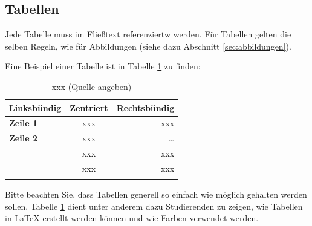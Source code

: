 \subsection{Tabellen}

Jede Tabelle muss im Fließtext referenziertw werden. Für Tabellen gelten die selben Regeln, wie für Abbildungen (siehe dazu Abschnitt \ref{sec:abbildungen}).

Eine Beispiel einer Tabelle ist in Tabelle \ref{tab:xxx} zu finden:
\begin{table}
	\centering
	\begin{tabular}{| >{\bfseries}l | c | r | }
		\hline
			\rowcolor{orange} \bfseries Linksbündig & \bfseries Zentriert & \bfseries Rechtsbündig \\
		\hline
		\hline
			Zeile 1 & xxx & xxx \\\hline
			Zeile 2 & xxx & \dots \\\hline
			\multirow{2}{*}{Zeile3}
			& xxx & xxx \\\cline{2-3}
			& xxx & xxx \\\hline
		\hline
			\multicolumn{3}{| c |}{xxx} \\\hline
	\end{tabular}
	\caption{xxx (Quelle angeben)}
	\label{tab:xxx}
\end{table}

Bitte beachten Sie, dass Tabellen generell so einfach wie möglich gehalten werden sollen. Tabelle \ref{tab:xxx} dient unter anderem dazu Studierenden zu zeigen, wie Tabellen in \LaTeX\xspace erstellt werden können und wie Farben verwendet werden.